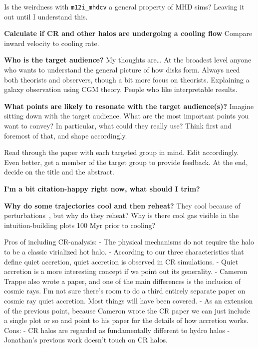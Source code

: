 \documentclass[fleqn,usenatbib]{mnras}
\begin{document}
Is the weirdness with \texttt{m12i\_mhdcv} a general property of MHD sims?
Leaving it out until I understand this.

\textbf{Calculate if CR and other halos are undergoing a cooling flow}
Compare inward velocity to cooling rate.

\textbf{
Who is the target audience?
}
My thoughts are\ldots
At the broadest level anyone who wants to understand the general picture of how disks form.
Always need both theorists and observers, though a bit more focus on theorists.
Explaining a galaxy observation using CGM theory.
People who like interpretable results.

\textbf{What points are likely to resonate with the target audience(s)?}
Imagine sitting down with the target audience.
What are the most important points you want to convey?
In particular, what could they really use?
Think first and foremost of that, and shape accordingly.

Read through the paper with each targeted group in mind.
Edit accordingly.
Even better, get a member of the target group to provide feedback.
At the end, decide on the title and the abstract.

\textbf{I'm a bit citation-happy right now, what should I trim?}

\textbf{Why do some trajectories cool and then reheat?}
They cool because of perturbations~\citep{Esmerian2020}, but why do they reheat?
Why is there cool gas visible in the intuition-building plots 100 Myr prior to cooling?

Pros of including CR-analysis:
- The physical mechanisms do not require the halo to be a classic virialized hot halo.
- According to our three characteristics that define quiet accretion, quiet accretion is observed in CR simulations.
- Quiet accretion is a more interesting concept if we point out its generality.
- Cameron Trappe also wrote a paper, and one of the main differences is the inclusion of cosmic rays. I'm not sure there's room to do a third entirely separate paper on cosmic ray quiet accretion. Most things will have been covered.
- As an extension of the previous point, because Cameron wrote the CR paper we can just include a single plot or so and point to his paper for the details of how accretion works.
Cons:
- CR halos are regarded as fundamentally different to hydro halos
- Jonathan's previous work doesn't touch on CR halos.
\end{document}
